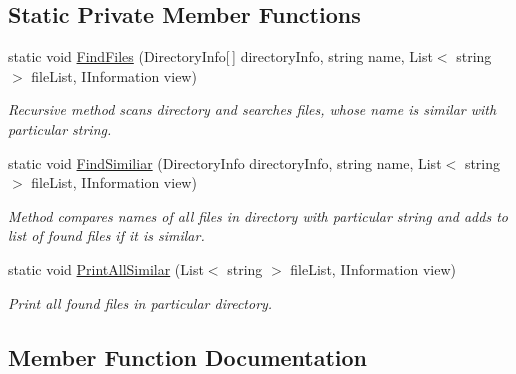 \subsection*{Static Private Member Functions}
\begin{DoxyCompactItemize}
\item 
static void \mbox{\hyperlink{class_home_work_1_1_task_library_1_1_tasks_1_1_lesson9_1_1_task2_aa558059c9feca37f20966ccebfaa923a}{Find\+Files}} (Directory\+Info\mbox{[}$\,$\mbox{]} directory\+Info, string name, List$<$ string $>$ file\+List, I\+Information view)
\begin{DoxyCompactList}\small\item\em Recursive method scans directory and searches files, whose name is similar with particular string. \end{DoxyCompactList}\item 
static void \mbox{\hyperlink{class_home_work_1_1_task_library_1_1_tasks_1_1_lesson9_1_1_task2_acc9e9ed0eba1b9a3f750802ede493386}{Find\+Similiar}} (Directory\+Info directory\+Info, string name, List$<$ string $>$ file\+List, I\+Information view)
\begin{DoxyCompactList}\small\item\em Method compares names of all files in directory with particular string and adds to list of found files if it is similar. \end{DoxyCompactList}\item 
static void \mbox{\hyperlink{class_home_work_1_1_task_library_1_1_tasks_1_1_lesson9_1_1_task2_aca5356ca3a47dff7d2a78a088ac22376}{Print\+All\+Similar}} (List$<$ string $>$ file\+List, I\+Information view)
\begin{DoxyCompactList}\small\item\em Print all found files in particular directory. \end{DoxyCompactList}\end{DoxyCompactItemize}


\subsection{Member Function Documentation}
\mbox{\label{class_home_work_1_1_task_library_1_1_tasks_1_1_lesson9_1_1_task2_aa558059c9feca37f20966ccebfaa923a}} 
